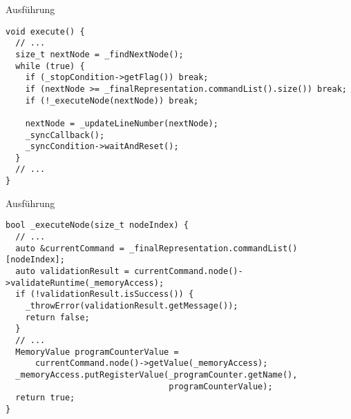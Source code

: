 
\begin{frame}[fragile]{Ausführung}
\begin{lstlisting}[style=C++]
void execute() {
  // ...
  size_t nextNode = _findNextNode();
  while (true) {
    if (_stopCondition->getFlag()) break;
    if (nextNode >= _finalRepresentation.commandList().size()) break;
    if (!_executeNode(nextNode)) break;

    nextNode = _updateLineNumber(nextNode);
    _syncCallback();
    _syncCondition->waitAndReset();
  }
  // ...
}
\end{lstlisting}
\end{frame}

\begin{frame}[fragile]{Ausführung}
\begin{lstlisting}[style=C++]
bool _executeNode(size_t nodeIndex) {
  // ...
  auto &currentCommand = _finalRepresentation.commandList()[nodeIndex];
  auto validationResult = currentCommand.node()->validateRuntime(_memoryAccess);
  if (!validationResult.isSuccess()) {
    _throwError(validationResult.getMessage());
    return false;
  }
  // ...
  MemoryValue programCounterValue =
      currentCommand.node()->getValue(_memoryAccess);
  _memoryAccess.putRegisterValue(_programCounter.getName(),
                                 programCounterValue);
  return true;
}
\end{lstlisting}
\end{frame}
